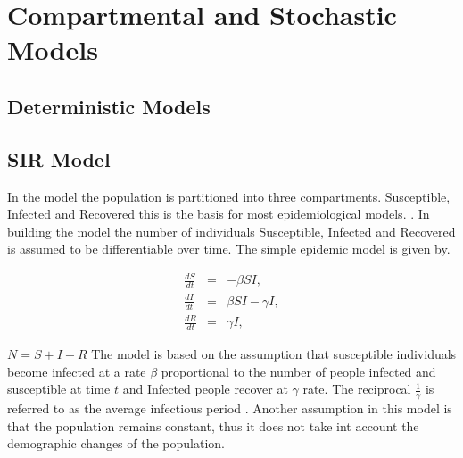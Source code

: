 \chapter{Compartmental and Stochastic Models}
\section{Deterministic Models}

\section{SIR Model}

In the model the population is partitioned into three compartments. Susceptible, Infected and Recovered this is the basis for most epidemiological models. \citep{m1925applications}. In building the model the number of individuals Susceptible, Infected and Recovered is assumed to be differentiable over time.
The simple epidemic model is given by.
\begin{center}
\begin{equation} \label{eqn4.1}
\left.\begin{array}{ccl}
\frac{dS}{dt} &= &-\beta SI,\\
 \frac{dI}{dt} &=& \beta S I - \gamma  I, \\
 \frac{dR}{dt} &= &\gamma  I,
\end{array} \right. 
\end{equation}
\end{center}
$N = S + I + R$
The model is based on the assumption that susceptible individuals become infected at a rate $\beta$ proportional to the number of people infected and susceptible at time $t$ and Infected people recover at $\gamma$ rate. The reciprocal $\frac{1}{\gamma}$ is referred to as the average infectious period . Another assumption in this model is that the population remains constant, thus it does not take int account the demographic changes of the population.



